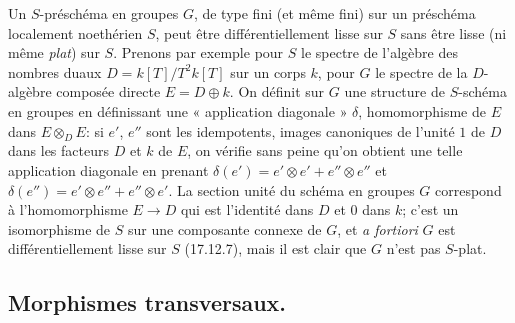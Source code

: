 \begin{remark}[17.12.8]
\label{IV.17.12.8}
Un $S$-préschéma en groupes $G$, de type fini (et même fini) sur un préschéma localement noethérien $S$, peut être différentiellement lisse sur $S$ sans être lisse (ni même \emph{plat}) sur $S$. Prenons par exemple pour $S$ le spectre de l'algèbre des nombres duaux $D=k[T]/T^2k[T]$ sur un corps $k$, pour $G$ le spectre de la $D$-algèbre composée directe $E=D\oplus k$. On définit sur $G$ une structure de $S$-schéma en groupes en définissant une « application diagonale » $\delta$, homomorphisme de $E$ dans $E\otimes_DE$: si $e'$, $e''$ sont les idempotents, images canoniques de l'unité $1$ de $D$ dans les facteurs $D$ et $k$ de $E$, on vérifie sans peine qu'on obtient une telle application diagonale en prenant $\delta(e')=e'\otimes e'+e''\otimes e''$ et $\delta(e'')=e'\otimes e''+e''\otimes e'$.
La section unité du schéma en groupes $G$ correspond à l'homomorphisme $E\to D$ qui est l'identité dans $D$ et $0$ dans $k$; c'est un isomorphisme de $S$ sur une composante connexe de $G$, et \emph{a fortiori} $G$ est différentiellement lisse sur $S$ (17.12.7), mais il est clair que $G$ n'est pas $S$-plat.
\end{remark}

\subsection{Morphismes transversaux.}
\label{IV.17.13}

